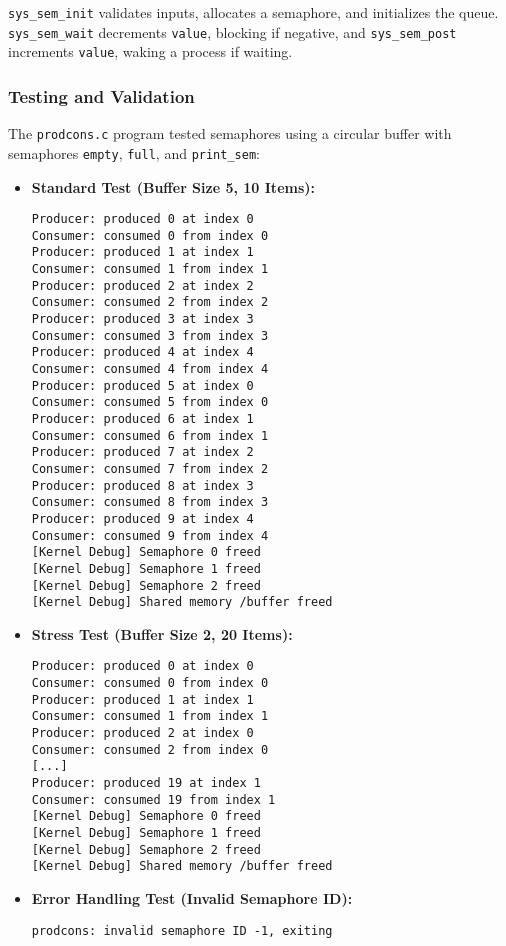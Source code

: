 \documentclass[12pt]{article}
\begin{document}
\texttt{sys\_sem\_init} validates inputs, allocates a semaphore, and initializes the queue. \texttt{sys\_sem\_wait} decrements \texttt{value}, blocking if negative, and \texttt{sys\_sem\_post} increments \texttt{value}, waking a process if waiting.

\subsubsection{Testing and Validation}
\label{subsubsec:semaphore-testing}

The \texttt{prodcons.c} program tested semaphores using a circular buffer with semaphores \texttt{empty}, \texttt{full}, and \texttt{print\_sem}:

\begin{itemize}
  \item \textbf{Standard Test (Buffer Size 5, 10 Items):}
    \begin{lstlisting}
Producer: produced 0 at index 0
Consumer: consumed 0 from index 0
Producer: produced 1 at index 1
Consumer: consumed 1 from index 1
Producer: produced 2 at index 2
Consumer: consumed 2 from index 2
Producer: produced 3 at index 3
Consumer: consumed 3 from index 3
Producer: produced 4 at index 4
Consumer: consumed 4 from index 4
Producer: produced 5 at index 0
Consumer: consumed 5 from index 0
Producer: produced 6 at index 1
Consumer: consumed 6 from index 1
Producer: produced 7 at index 2
Consumer: consumed 7 from index 2
Producer: produced 8 at index 3
Consumer: consumed 8 from index 3
Producer: produced 9 at index 4
Consumer: consumed 9 from index 4
[Kernel Debug] Semaphore 0 freed
[Kernel Debug] Semaphore 1 freed
[Kernel Debug] Semaphore 2 freed
[Kernel Debug] Shared memory /buffer freed
    \end{lstlisting}
  \item \textbf{Stress Test (Buffer Size 2, 20 Items):}
    \begin{lstlisting}
Producer: produced 0 at index 0
Consumer: consumed 0 from index 0
Producer: produced 1 at index 1
Consumer: consumed 1 from index 1
Producer: produced 2 at index 0
Consumer: consumed 2 from index 0
[...]
Producer: produced 19 at index 1
Consumer: consumed 19 from index 1
[Kernel Debug] Semaphore 0 freed
[Kernel Debug] Semaphore 1 freed
[Kernel Debug] Semaphore 2 freed
[Kernel Debug] Shared memory /buffer freed
    \end{lstlisting}
  \item \textbf{Error Handling Test (Invalid Semaphore ID):}
    \begin{lstlisting}
prodcons: invalid semaphore ID -1, exiting
    \end{lstlisting}
\end{itemize}
\end{document}
